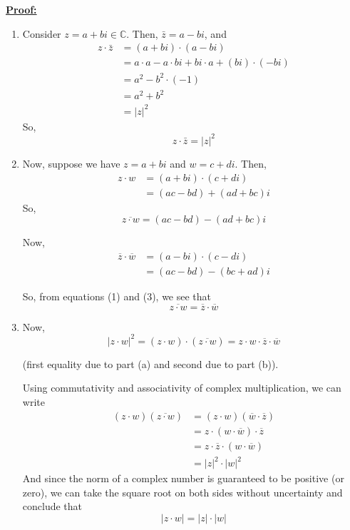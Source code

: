 \documentclass{article}
\newcommand{\C}{\mathbb{C}}
\begin{document}
\vskip 0.5cm
\underline{\textbf{Proof:}} 
\begin{enumerate}[label=(\alph*)]
  \item Consider $z = a + bi \in \C$. Then, $\bar{z} = a - bi$, and 
  \begin{align*}
    z \cdot \bar{z} &= (a + bi) \cdot (a - bi) \\
    &= a \cdot a - a \cdot bi + bi \cdot a + (bi) \cdot (-bi) \\
    &= a^2 - b^2 \cdot (-1) \\
    &= a^2 + b^2 \\
    &= |z|^2
  \end{align*}
  So, 
  \[ \boxed{z \cdot \bar{z} = |z|^2} \]
  \vskip 0.5cm

  \item Now, suppose we have $z = a + bi$ and $w = c + di$. Then, 
  \begin{align*}
    z \cdot w &= (a + bi) \cdot (c + di) \\
    &= (ac - bd) + (ad + bc)i
  \end{align*}
  So, 
  \begin{equation}
    \overline{z \cdot w} = (ac - bd) - (ad + bc)i
  \end{equation}

  Now,
  \begin{align}
    \overline{z} \cdot \overline{w} &= (a - bi) \cdot (c - di) \\
    &= (ac - bd) - (bc + ad)i
  \end{align}

  So, from equations (1) and (3), we see that 
  \[ \boxed{\overline{z \cdot w} = \overline{z} \cdot \overline{w}} \]

  \vskip 0.5cm
  \item Now,  
  \[ |z \cdot w|^2 = (z \cdot w) \cdot (\overline{z \cdot w}) = z \cdot w \cdot \overline{z} \cdot \overline{w} \]
  
  (first equality due to part (a) and second due to part (b)).
  \vskip 0.5cm

  Using commutativity and associativity of complex multiplication, we can write 
  \begin{align*}
    (z \cdot w) (\overline{z \cdot w}) &= (z \cdot w) (\overline{w} \cdot \overline{z}) \\
    &= z \cdot (w \cdot \overline{w}) \cdot \overline{z} \\
    &= z \cdot \overline{z} \cdot  (w \cdot \overline{w}) \\
    &= |z|^2 \cdot  |w|^2 
  \end{align*}
  And since the norm of a complex number is guaranteed to be positive (or zero), we can take the square root on both sides without uncertainty and conclude that 
  \[ \boxed{|z \cdot w| = |z| \cdot |w|} \]
\end{enumerate}
\end{document}
